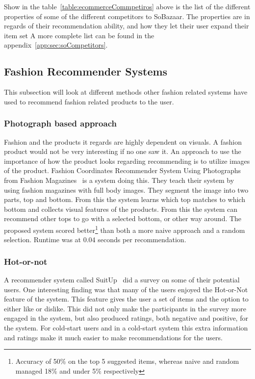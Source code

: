     Show in the table~\ref{table:ecommerceCommpetiros} above is the list of the different properties of some of the different competitors to SoBazaar. The properties are in regards of their recommendation ability, and how they let their user expand their item set
    A more complete list can be found in the appendix~\ref{app:sec:soCompetitors}.




\subsection{Fashion Recommender Systems}
    This subsection will look at different methods other fashion related systems have used to recommend fashion related products to the user.

\subsubsection{Photograph based approach}
    Fashion and the products it regards are highly dependent on visuals.  A fashion
    product would not be very interesting if no one saw it.  An approach to use the
    importance of how the product looks regarding recommending is to utilize images
    of the product.  Fashion Coordinates Recommender System Using Photographs from
    Fashion Magazines~\cite{Iwata:2011} is a system doing this.  They teach their
    system by using fashion magazines with full body images.  They segment the
    image into two parts, top and bottom.  From this the system learns which top
    matches to which bottom and collects visual features of the products.  From
    this the system can recommend other tops to go with a selected bottom, or other
    way around.  The proposed system scored better\footnote{Accuracy of 50\% on the
    top 5 suggested items, whereas naive and random managed 18\% and under 5\%
    respectively} than both a more naive approach and a random selection.  Runtime
    was at 0.04 seconds per recommendation.

\subsubsection{Hot-or-not}
    A recommender system called SuitUp~\cite{SuitUp} did a survey on some of their potential users.
    One interesting finding was that many of the users enjoyed the Hot-or-Not feature of the system.
    This feature gives the user a set of items and the option to either like or dislike.
    This did not only make the participants in the survey more engaged in the system, but also produced ratings, both negative and positive, for the system.
    For cold-start users and in a cold-start system this extra information and ratings make it much easier to make recommendations for the users.

